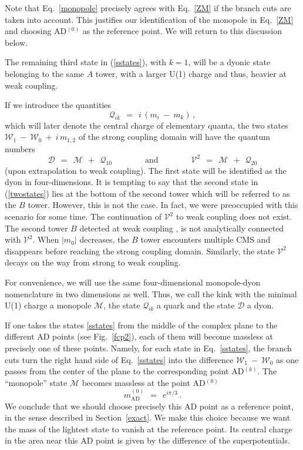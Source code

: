 \documentclass[epsfig,12pt]{article}
\def\beq{\begin{equation}}
\def\eeq{\end{equation}}
\def\beq{\begin{equation}}
\def\eeq{\end{equation}}
\newcommand{\W}{\mathcal{W}}
\newcommand{\M}{\mathcal{M}}
\newcommand{\Q}{\mathcal{Q}}
\newcommand{\D}{\mathcal{D}}
\newcommand{\V}{\mathcal{V}}
\begin{document}
	
	Note that Eq.~\eqref{monopole} precisely agrees with Eq.~\eqref{ZM} if the branch cuts are taken into account.
	This justifies our identification of the monopole in Eq.~\eqref{ZM} and choosing AD$^{(0)}$ as the reference point.
	We will return to this discussion below.
	
	The remaining third state in (\ref{sstates}), with $k=1$, will be a dyonic state belonging to the same
	$A$ tower, with a larger U(1) charge and thus, heavier at weak coupling.

	If we introduce the quantities
\beq
\label{quark}
	\Q_{ik} ~~=~~ i\, \left( m_i  ~-~ m_k \right)\,,
\eeq
	which will later denote the central charge of elementary quanta, 
	the  two states 
	$ \W_1 ~-~ \W_0 ~+~ i\, m_{1,2} $
	of the strong coupling domain will have the quantum numbers 
\beq
\label{twostates}
	\D  ~~=~~  \M ~~+~~ \Q_{10}  \qquad\qquad  \text{and}  \qquad\qquad   
	\V^2  ~~=~~  \M ~~+~~ \Q_{20}
\eeq
(upon extrapolation to weak coupling).
	The first state will be identified as the dyon in four-dimensions. It is tempting to say that
	the second state in (\ref{twostates}) lies at the bottom of the second tower which will be referred to as the
	$B$ tower. 
	However, this is not the case. 
	In fact, we were preoccupied with this scenario for some time.
	The continuation of $\V^2$ to weak coupling 
	does not exist. 
	The second tower $B$ detected at weak coupling \cite{Bolokhov:2011mp},
	is not analytically connected with $\V^2$.
	When $|m_0|$ decreases, the $ B $ tower encounters multiple CMS and disappears
	before reaching the strong coupling domain.
	Similarly, the state $ \V^2 $ decays on the way from strong to weak coupling.
	
	For convenience, we will use the same four-dimensional monopole-dyon nomenclature in two dimensions as well.
	Thus, we call the kink with the minimal U(1) charge a monopole $ \M $, 
	the state $ \Q_{ik} $ a quark and the state $ \D $ a dyon.

	If one takes the states \eqref{sstates} from the middle of the complex plane to the different AD points 
	(see Fig.~\ref{fcp2}), each of them will become massless at precisely one of these points.
	Namely, for each state in Eq.~\eqref{sstates}, 
	the branch cuts turn the right hand side of Eq.~\eqref{sstates} into 
	the difference $ \W_1 ~-~ \W_0 $ as one passes from the center of the plane to the corresponding point AD$^{(k)}$.
	The ``monopole'' state $ \M $ becomes massless at the point AD$^{(0)}$
\beq
	m_\text{AD}^{(0)} ~~=~~ e^{i \pi / 3}\,.
\eeq
	We conclude that we should choose precisely this AD point as a reference point, 
	in the sense described in Section~\ref{exact}.
	We make this choice because we want the mass of the lightest state to vanish at the reference point. 
	Its central charge in the area near this AD point is given by the difference of the superpotentials.
\end{document}
